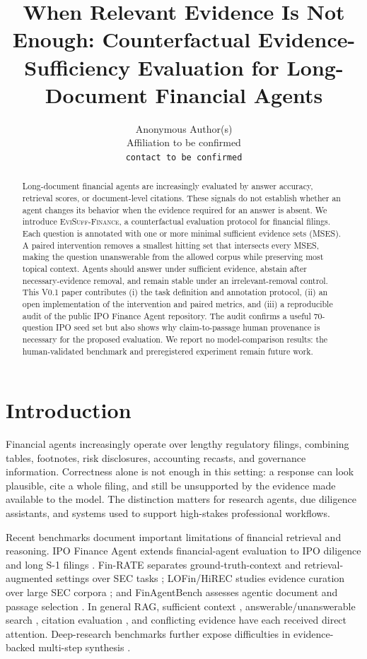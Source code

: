 \documentclass{article}
\title{When Relevant Evidence Is Not Enough: Counterfactual Evidence-Sufficiency Evaluation for Long-Document Financial Agents}
\author{Anonymous Author(s)\\
Affiliation to be confirmed\\
\texttt{contact to be confirmed}}
\newcommand{\benchmark}{\textsc{EviSuff-Finance}}
\newcommand{\mses}{\textsc{MSES}}
\begin{document}
\maketitle

\begin{abstract}
Long-document financial agents are increasingly evaluated by answer accuracy,
retrieval scores, or document-level citations. These signals do not establish
whether an agent changes its behavior when the evidence required for an answer
is absent. We introduce \benchmark{}, a counterfactual evaluation protocol for
financial filings. Each question is annotated with one or more minimal
sufficient evidence sets (\mses{}). A paired intervention removes a smallest
hitting set that intersects every \mses{}, making the question unanswerable
from the allowed corpus while preserving most topical context. Agents should
answer under sufficient evidence, abstain after necessary-evidence removal, and
remain stable under an irrelevant-removal control. This V0.1 paper contributes
(i) the task definition and annotation protocol, (ii) an open implementation
of the intervention and paired metrics, and (iii) a reproducible audit of the
public IPO Finance Agent repository. The audit confirms a useful 70-question
IPO seed set but also shows why claim-to-passage human provenance is necessary
for the proposed evaluation. We report no model-comparison results: the
human-validated benchmark and preregistered experiment remain future work.
\end{abstract}

\section{Introduction}

Financial agents increasingly operate over lengthy regulatory filings,
combining tables, footnotes, risk disclosures, accounting recasts, and
governance information. Correctness alone is not enough in this setting: a
response can look plausible, cite a whole filing, and still be unsupported by
the evidence made available to the model. The distinction matters for research
agents, due diligence assistants, and systems used to support high-stakes
professional workflows.

Recent benchmarks document important limitations of financial retrieval and
reasoning. IPO Finance Agent extends financial-agent evaluation to IPO
diligence and long S-1 filings \citep{benhenda2026ipo}. Fin-RATE separates
ground-truth-context and retrieval-augmented settings over SEC tasks
\citep{jiang2026finrate}; LOFin/HiREC studies evidence curation over large SEC
corpora \citep{choe2025hirec}; and FinAgentBench assesses agentic document and
passage selection \citep{choi2025finagentbench}. In general RAG, sufficient
context \citep{joren2024sufficient}, answerable/unanswerable search
\citep{xie2026oversearch}, citation evaluation \citep{gao2023alce}, and
conflicting evidence \citep{lee2025magic,niu2026arbgraph} have each received
direct attention. Deep-research benchmarks further expose difficulties in
evidence-backed multi-step synthesis \citep{sharma2025researchrubrics,gou2025mind2web}.
\end{document}

